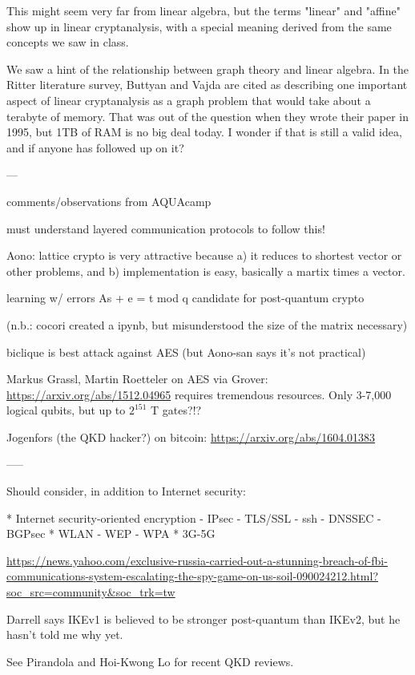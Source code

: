 \documentclass[%
 aip,
 jmp,%
 amsmath,amssymb,
 reprint,%
]{revtex4-1}
\begin{document}
This might seem very far from linear algebra, but the terms "linear"
and "affine" show up in linear cryptanalysis, with a special meaning
derived from the same concepts we saw in class.

We saw a hint of the relationship between graph theory and linear
algebra.  In the Ritter literature survey, Buttyan and Vajda are cited
as describing one important aspect of linear cryptanalysis as a graph
problem that would take about a terabyte of memory.  That was out of
the question when they wrote their paper in 1995, but 1TB of RAM is no
big deal today.  I wonder if that is still a valid idea, and if anyone
has followed up on it?

---

comments/observations from AQUAcamp

must understand layered communication protocols to follow this!

Aono: lattice crypto is very attractive because a) it reduces to
shortest vector or other problems, and b) implementation is easy,
basically a martix times a vector.

learning w/ errors As + e = t mod q
candidate for post-quantum crypto

(n.b.: cocori created a ipynb, but misunderstood the size of the
matrix necessary)

biclique is best attack against AES
(but Aono-san says it's not practical)

Markus Grassl, Martin Roetteler on AES via Grover:
\url{https://arxiv.org/abs/1512.04965}
requires tremendous resources.
Only 3-7,000 logical qubits, but up to $2^{151}$ T gates?!?

Jogenfors (the QKD hacker?) on bitcoin:
\url{https://arxiv.org/abs/1604.01383}

-----

Should consider, in addition to Internet security:

* Internet security-oriented encryption
  - IPsec
  - TLS/SSL
  - ssh
  - DNSSEC
  - BGPsec
* WLAN
  - WEP
  - WPA
* 3G-5G

\url{https://news.yahoo.com/exclusive-russia-carried-out-a-stunning-breach-of-fbi-communications-system-escalating-the-spy-game-on-us-soil-090024212.html?soc_src=community&soc_trk=tw}

Darrell says IKEv1 is believed to be stronger post-quantum than IKEv2,
but he hasn't told me why yet.

See Pirandola and Hoi-Kwong Lo for recent QKD reviews.
\end{document}
